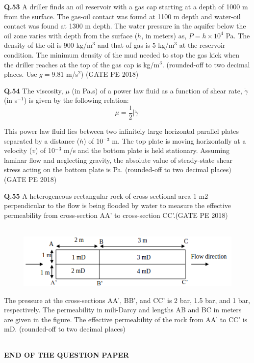 \documentclass[15pt,a4paper]{article}
\begin{document}
\vspace{1cm}

\noindent\textbf{Q.53} A driller finds an oil reservoir with a gas cap starting at a depth of 1000 m from the surface. The gas-oil contact was found at 1100 m depth and water-oil contact was found at 1300 m depth. The water pressure in the aquifer below the oil zone varies with depth from the surface ($h$, in meters) as, $P = h \times 10^4$ Pa. The density of the oil is 900 kg/m$^3$ and that of gas is 5 kg/m$^3$ at the reservoir condition. The minimum density of the mud needed to stop the gas kick when the driller reaches at the top of the gas cap is \underline{\hspace{2cm}} kg/m$^3$. (rounded-off to two decimal places. Use $g = 9.81$ m/s$^2$) \hfill (GATE PE 2018)

\vspace{0.7cm}

\noindent\textbf{Q.54} The viscosity, $\mu$ (in Pa.s) of a power law fluid as a function of shear rate, $\dot{\gamma}$ (in s$^{-1}$) is given by the following relation: 
\[ \mu = \frac{1}{2} |\dot{\gamma}| \]

This power law fluid lies between two infinitely large horizontal parallel plates separated by a distance ($h$) of 10$^{-3}$ m. The top plate is moving horizontally at a velocity ($v$) of 10$^{-3}$ m/s and the bottom plate is held stationary. Assuming laminar flow and neglecting gravity, the absolute value of steady-state shear stress acting on the bottom plate is \underline{\hspace{2cm}} Pa. (rounded-off to two decimal places) \hfill (GATE PE 2018)

\pagebreak

\noindent
\textbf{Q.55} A heterogeneous rectangular rock of cross-sectional area 1 m2 perpendicular to the flow is
being flooded by water to measure the effective permeability from cross-section AA’ to
cross-section CC’.\hfill(GATE PE 2018)\\\\

\begin{figure}[h!]
  \centering
  \includegraphics[width=0.8\columnwidth]{pic12.png} 
\end{figure}

The pressure at the cross-sections AA’, BB’, and CC’ is 2 bar, 1.5 bar, and 1 bar,
respectively. The permeability in mili-Darcy and lengths AB and BC in meters are given in
the figure. The effective permeability of the rock from AA’ to CC’ is \underline{\hspace{4cm}}mD. 
(rounded-off to two decimal places)\\\\
\vspace{6cm}
\begin{center}
	{\LARGE \textbf{END OF THE QUESTION PAPER}}
\end{center}
\end{document}
